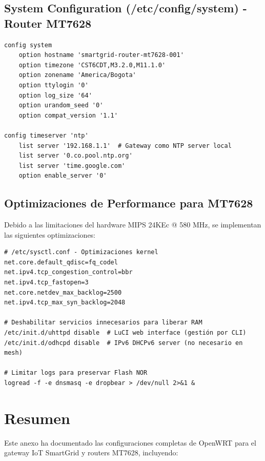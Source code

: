 \subsection{System Configuration (/etc/config/system) - Router MT7628}

\begin{verbatim}
config system
    option hostname 'smartgrid-router-mt7628-001'
    option timezone 'CST6CDT,M3.2.0,M11.1.0'
    option zonename 'America/Bogota'
    option ttylogin '0'
    option log_size '64'
    option urandom_seed '0'
    option compat_version '1.1'

config timeserver 'ntp'
    list server '192.168.1.1'  # Gateway como NTP server local
    list server '0.co.pool.ntp.org'
    list server 'time.google.com'
    option enable_server '0'
\end{verbatim}

\subsection{Optimizaciones de Performance para MT7628}

Debido a las limitaciones del hardware MIPS 24KEc @ 580 MHz, se implementan las siguientes optimizaciones:

\begin{verbatim}
# /etc/sysctl.conf - Optimizaciones kernel
net.core.default_qdisc=fq_codel
net.ipv4.tcp_congestion_control=bbr
net.ipv4.tcp_fastopen=3
net.core.netdev_max_backlog=2500
net.ipv4.tcp_max_syn_backlog=2048

# Deshabilitar servicios innecesarios para liberar RAM
/etc/init.d/uhttpd disable  # LuCI web interface (gestión por CLI)
/etc/init.d/odhcpd disable  # IPv6 DHCPv6 server (no necesario en mesh)

# Limitar logs para preservar Flash NOR
logread -f -e dnsmasq -e dropbear > /dev/null 2>&1 &
\end{verbatim}

\section{Resumen}

Este anexo ha documentado las configuraciones completas de OpenWRT para el gateway IoT SmartGrid y routers MT7628, incluyendo:

